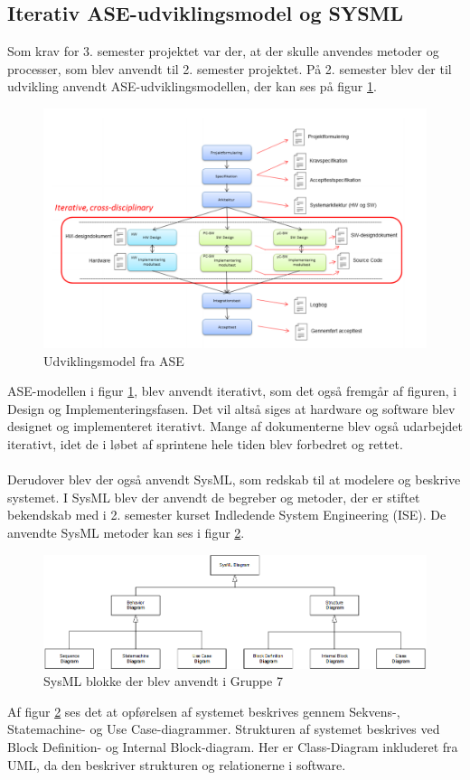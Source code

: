 \documentclass[Rapport/Rapport_main.tex]{subfiles}
\begin{document}
\subsection{Iterativ ASE-udviklingsmodel og SYSML}
Som krav for 3. semester projektet var der, at der skulle anvendes metoder og processer, som blev anvendt til 2. semester projektet. På 2. semester blev der til udvikling anvendt ASE-udviklingsmodellen, der kan ses på figur \ref{fig:rap_ase_model}.
\begin{figure}[H]
    \centering
    \includegraphics[width=\textwidth]{Processdokument/graphics/ASE_model.png}
    \caption{Udviklingsmodel fra ASE}
    \label{fig:rap_ase_model}
\end{figure}
ASE-modellen i figur \ref{fig:rap_ase_model}, blev anvendt iterativt, som det også fremgår af figuren, i Design og Implementeringsfasen. Det vil altså siges at hardware og software blev designet og implementeret iterativt. Mange af dokumenterne blev også udarbejdet iterativt, idet de i løbet af sprintene hele tiden blev forbedret og rettet.\\\\
Derudover blev der også anvendt SysML, som redskab til at modelere og beskrive systemet. I SysML blev der anvendt de begreber og metoder, der er stiftet bekendskab med i 2. semester kurset Indledende System Engineering (ISE). De anvendte SysML metoder kan ses i figur \ref{fig:rap_sysml_usage}.
\begin{figure}[H]
    \centering
    \includegraphics[width=\textwidth]{Processdokument/graphics/Sysml_usage.png}
    \caption{SysML blokke der blev anvendt i Gruppe 7}
    \label{fig:rap_sysml_usage}
\end{figure}
Af figur \ref{fig:rap_sysml_usage} ses det at opførelsen af systemet beskrives gennem Sekvens-, Statemachine- og Use Case-diagrammer.
Strukturen af systemet beskrives ved Block Definition- og Internal Block-diagram. Her er Class-Diagram inkluderet fra UML, da den beskriver strukturen og relationerne i software.
\end{document}
